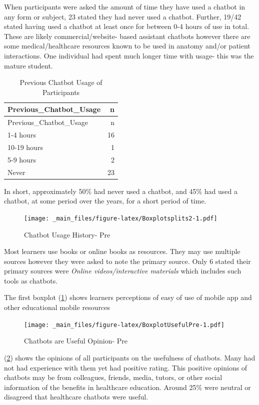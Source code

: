 \documentclass[a4paper, nobind]{templates/ociamthesis}
\begin{document}
When participants were asked the amount of time they have used a chatbot
in any form or subject, 23 stated they had never used a chatbot.
Further, 19/42 stated having used a chatbot at least once for between
0-4 hours of use in total. These are likely commercial/website- based
assistant chatbots however there are some medical/healthcare resources
known to be used in anatomy and/or patient interactions. One individual
had spent much longer time with usage- this was the mature student.

\begin{longtable}[]{@{}lr@{}}
\caption{Previous Chatbot Usage of Participants}\tabularnewline
\toprule()
Previous\_Chatbot\_Usage & n \\
\midrule()
\endfirsthead
\toprule()
Previous\_Chatbot\_Usage & n \\
\midrule()
\endhead
1-4 hours & 16 \\
10-19 hours & 1 \\
5-9 hours & 2 \\
Never & 23 \\
\bottomrule()
\end{longtable}

In short, approximately 50\% had never used a chatbot, and 45\% had used a
chatbot, at some period over the years, for a short period of time.

\begin{figure}
\centering
\texttt{[image: \_main\_files/figure-latex/Boxplotsplits2-1.pdf]}
\caption{\label{fig:Boxplotsplits2}Chatbot Usage History- Pre}
\end{figure}

Most learners use books or online books as resources. They may use
multiple sources however they were asked to note the primary source.
Only 6 stated their primary sources were \emph{Online videos/interactive
materials} which includes such tools as chatbots.

The first boxplot (\ref{fig:Boxplotsplits2}) shows learners perceptions
of easy of use of mobile app and other educational mobile resources

\begin{figure}
\centering
\texttt{[image: \_main\_files/figure-latex/BoxplotUsefulPre-1.pdf]}
\caption{\label{fig:BoxplotUsefulPre}Chatbots are Useful Opinion- Pre}
\end{figure}

(\ref{fig:BoxplotUsefulPre}) shows the opinions of all participants on
the usefulness of chatbots. Many had not had experience with them yet
had positive rating. This positive opinions of chatbots may be from
colleagues, friends, media, tutors, or other social information of the
benefits in healthcare education. Around 25\% were neutral or disagreed
that healthcare chatbots were useful.
\end{document}
